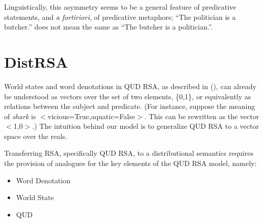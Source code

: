 \documentclass[10pt,letterpaper,twocolumn]{article}
\begin{document}
Linguistically, this asymmetry seems to be a general feature of predicative statements, and \emph{a fortiriori}, of predicative metaphors; ``The politician is a butcher.'' does not mean the same as ``The butcher is a politician.''.







\section{DistRSA}

World states and word denotations in QUD RSA, as described in (\cite{kao}), can already be understood as vectors over the set of two elements, \{0,1\}, or equivalently as relations between the subject and predicate. (For instance, suppose the meaning of \emph{shark} is $<$vicious=True,aquatic=False$>$. This can be rewritten as the vector $<$1,0$>$.) The intuition behind our model is to generalize QUD RSA to a vector space over the reals.

Transferring RSA, specifically QUD RSA, to a distributional semantics requires the provision of analogues for the key elements of the QUD RSA model, namely:

	\begin{itemize}
	\item Word Denotation
	\item World State
	\item QUD
	\end{itemize}
\end{document}
